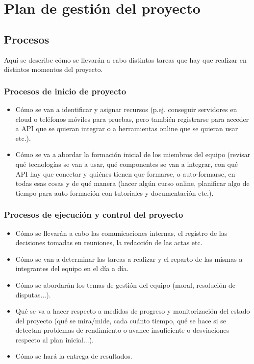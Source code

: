 \documentclass[12pt]{article}%
\begin{document}

\section{Plan de gesti\'on del proyecto} %

\subsection{Procesos}

Aqu\'i se describe c\'omo se llevar\'an a cabo distintas tareas que hay que realizar en distintos momentos del proyecto.

\subsubsection{Procesos de inicio de proyecto}

\begin{itemize}
	\item C\'omo se van a identificar y asignar recursos (p.ej. conseguir servidores en cloud o tel\'efonos m\'oviles para pruebas, pero tambi\'en registrarse para acceder a API que se quieran integrar o a herramientas online que se quieran usar etc.).
	\item C\'omo se va a abordar la formaci\'on inicial de los miembros del equipo (revisar qu\'e tecnolog\'ias se van a usar, qu\'e componentes se van a integrar, con qu\'e API hay que conectar y qui\'enes tienen que formarse, o auto-formarse, en todas esas cosas y de qu\'e manera (hacer alg\'un curso online, planificar algo de tiempo para auto-formaci\'on con tutoriales y documentaci\'on etc.).
\end{itemize}

\subsubsection{Procesos de ejecuci\'on y control del proyecto}
\begin{itemize}
	\item C\'omo se llevar\'an a cabo las comunicaciones internas, el registro de las decisiones tomadas en reuniones, la redacci\'on de las actas etc.
	\item C\'omo se van a determinar las tareas a realizar y el reparto de las mismas a integrantes del equipo en el d\'ia a d\'ia.
	\item C\'omo se abordar\'an los temas de gesti\'on del equipo (moral, resoluci\'on de disputas...).
	\item Qu\'e se va a hacer respecto a medidas de progreso y monitorizaci\'on del estado del proyecto (qu\'e se mira/mide, cada cu\'anto tiempo, qu\'e se hace si se detectan problemas de rendimiento o avance insuficiente o desviaciones respecto al plan inicial...).
	\item C\'omo se har\'a la entrega de resultados.
\end{itemize}
\end{document}
